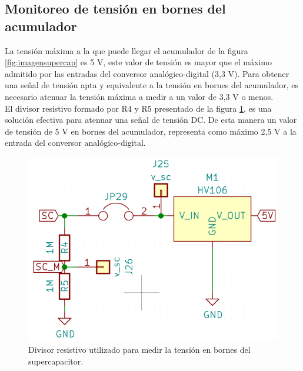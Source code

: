 \subsection{Monitoreo de tensión en bornes del acumulador}
La tensión máxima a la que puede llegar el acumulador de la figura \ref{fig:imagensupercap} es 5 V, este valor de tensión es mayor que el máximo admitido por las entradas del conversor analógico-digital (3,3 V). Para obtener una señal de tensión apta y equivalente a la tensión en bornes del acumulador, es necesario atenuar la tensión máxima a medir a un valor de 3,3 V o menos.\\
El divisor resistivo formado por R4 y R5 presentado de la figura \ref{fig:ctodivisorresistivo}, es una solución efectiva para atenuar una señal de tensión DC. De esta manera un valor de tensión de 5 V en bornes del acumulador, representa como máximo 2,5 V a la entrada del conversor analógico-digital.\\
\begin{figure}[h!]
	\centering
	\includegraphics[width=0.7\linewidth]{Figures/cto_divisor_resistivo}
	\caption{Divisor resistivo utilizado para medir la tensión en bornes del supercapacitor.}
	\label{fig:ctodivisorresistivo}
\end{figure}

